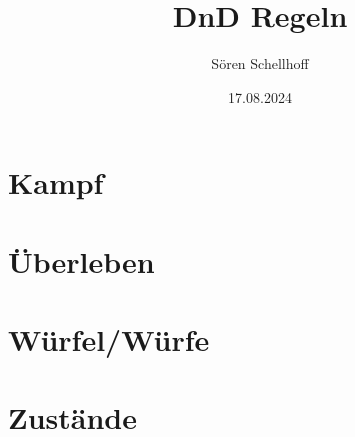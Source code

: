 \documentclass{book}
\title{DnD Regeln}
\author{Sören Schellhoff}
\date{17.08.2024}
\newcommand{\chapterfile}[2]{\chapter{#1} }
\begin{document}
\maketitle

\tableofcontents

\chapterfile{Kampf}{fight}

\chapterfile{Überleben}{survival}

\chapterfile{Würfel/Würfe}{dice}

\chapterfile{Zustände}{conditions}
\end{document}
